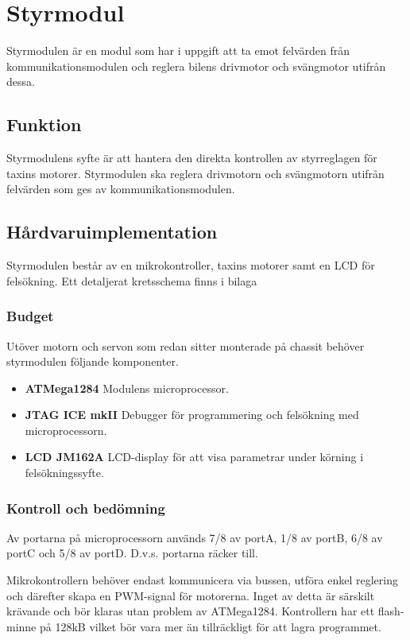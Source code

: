 \documentclass[designspec/spec.tex]{subfiles}
\begin{document}
\section{Styrmodul}
Styrmodulen är en modul som har i uppgift att ta emot felvärden från
kommunikationsmodulen och reglera bilens drivmotor och svängmotor utifrån
dessa.

\subsection{Funktion}
Styrmodulens syfte är att hantera den direkta kontrollen av styrreglagen för
taxins motorer. Styrmodulen ska reglera drivmotorn och svängmotorn utifrån
felvärden som ges av kommunikationsmodulen.

\subsection{Hårdvaruimplementation}
Styrmodulen består av en mikrokontroller, taxins motorer samt en LCD för
felsökning. Ett detaljerat kretsschema finns i bilaga %

\subsubsection{Budget}
Utöver motorn och servon som redan sitter monterade på chassit behöver
styrmodulen följande komponenter.
\begin{itemize}
	\item \textbf{ATMega1284} Modulens microprocessor. 
    \item \textbf{JTAG ICE mkII} Debugger för programmering och felsökning med
    microprocessorn. 
    \item \textbf{LCD JM162A} LCD-display för att visa parametrar under körning
    i felsökningssyfte.
\end{itemize}

\subsubsection{Kontroll och bedömning}
Av portarna på microprocessorn används 7/8 av portA, 1/8 av portB, 6/8 av portC
och 5/8 av portD. D.v.s. portarna räcker till.

Mikrokontrollern behöver endast kommunicera via bussen, utföra enkel reglering
och därefter skapa en PWM-signal för motorerna. Inget av detta är särskilt
krävande och bör klaras utan problem av ATMega1284. Kontrollern har ett
flash-minne på 128kB vilket bör vara mer än tillräckligt för att lagra
programmet.
\end{document}
